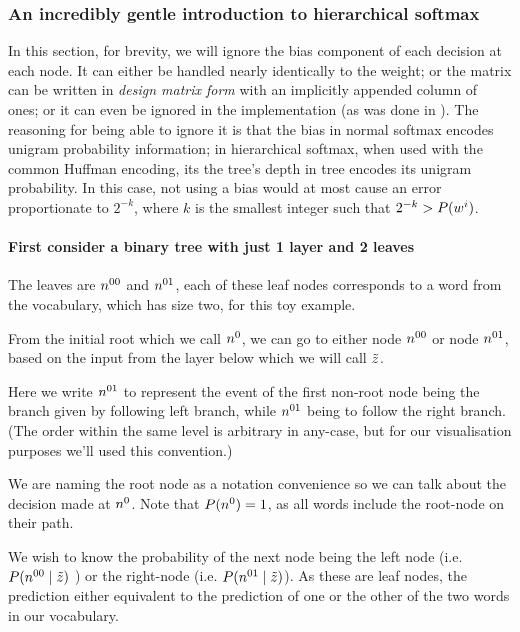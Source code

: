 \documentclass[parskip]{komatufte}
\begin{document}
\subsubsection{An incredibly gentle introduction to hierarchical softmax}
In this section, for brevity, we will ignore the bias component of each decision at each node.
It can either be handled nearly identically to the weight;
or the matrix can be written in \emph{design matrix form} with an implicitly appended column of ones;
or it can even be ignored in the implementation (as was done in \textcite{mikolov2013efficient}).
The reasoning for being able to ignore it is that the bias in normal softmax encodes unigram probability information;
in hierarchical softmax, when used with the common Huffman encoding, its the tree's depth in tree encodes its unigram probability. In this case, not using a bias would at most cause an error proportionate to $2^{-k}$, where $k$ is the smallest integer such that $2^{-k}>P(\n w_i)$.


\paragraph{First consider a binary tree with just 1 layer and 2 leaves}
The leaves are $\n n_{00}$ and $\n n_{01}$, each of these leaf nodes corresponds to a word from the vocabulary, which has size two, for this toy example.

	
From the initial root which we call $\n n_{0}$, we can go to
either node $\n n_{00}$ or node $\n n_{01}$, based on the input from the
layer below which we will call $\tilde{z}$.


Here we write $\n n_{01}$ to represent the event of the first non-root
node being the branch given by following left branch, while $\n n_{01}$
being to follow the right branch.
(The order within the same level is arbitrary in any-case, but for our visualisation purposes we'll used this convention.) 

We are naming the root node as a notation convenience so we can talk
about the decision made at $\n n_{0}$. 
Note that $P(\n n_{0})=1$, as all words include the root-node on their path.

We wish to know the probability of the next node being the left node (i.e.
$P(\n n_{00}\mid \v z)$ ) or the right-node (i.e. $P(\n n_{01}\mid \v z)$).
As these are leaf nodes, the prediction either equivalent to the prediction of one or the other of the two words in our vocabulary.
\end{document}
